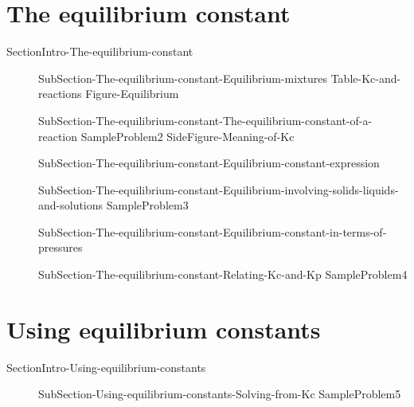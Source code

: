 \documentclass[main.tex]{subfiles}
\newcommand\chapterlabel{Ch-equilibrium}\setcounter{figurenewcounter}{0}\setcounter{tablenewcounter}{0}\setcounter{formulanewcounter}{0}\chapterpicture{../{\chapterlabel}/figure1}\chapterpicturelabel{PxFuel}
\begin{document}
\section{{The equilibrium constant}}   {SectionIntro-The-equilibrium-constant}
\sloppy\begin{description}
\item[] {SubSection-The-equilibrium-constant-Equilibrium-mixtures}
{Table-Kc-and-reactions}\newpage
{Figure-Equilibrium}
\item[] {SubSection-The-equilibrium-constant-The-equilibrium-constant-of-a-reaction}
{SampleProblem2}
{SideFigure-Meaning-of-Kc}
\item[] {SubSection-The-equilibrium-constant-Equilibrium-constant-expression}
\item[] {SubSection-The-equilibrium-constant-Equilibrium-involving-solids-liquids-and-solutions}
{SampleProblem3}
\item[] {SubSection-The-equilibrium-constant-Equilibrium-constant-in-terms-of-pressures}%
\item[] {SubSection-The-equilibrium-constant-Relating-Kc-and-Kp}%
{SampleProblem4}%
\end{description}

\section{ {Using equilibrium constants}}   {SectionIntro-Using-equilibrium-constants}
\sloppy\begin{description}
\item[]{SubSection-Using-equilibrium-constants-Solving-from-Kc}
{SampleProblem5}
\end{description}
 
\end{document}
